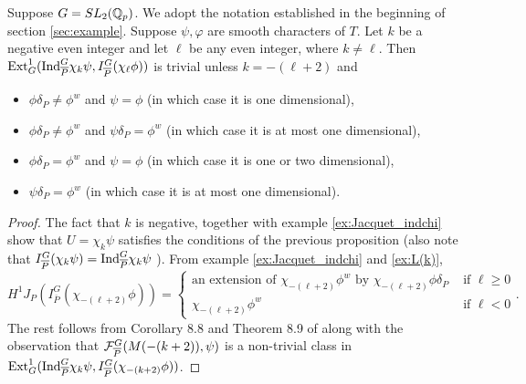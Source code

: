 \documentclass[10pt]{amsart}
\begin{document}
\begin{corollary}
Suppose $G=SL_{2}(\mathbb{Q}_{p})$. We adopt the notation established in the beginning of section \ref{sec:example}.  Suppose $\psi, \varphi$ are smooth characters of $T$. Let $k$ be a negative even integer and let $\ell$ be any even integer, where $k\neq \ell$. Then $\textnormal{Ext}^{1}_{G}(\textnormal{Ind}_{\overline{P}}^{G}\chi_{k}\psi,I_{\overline{P}}^{G}(\chi_{\ell}\phi))$ is trivial unless $k=-(\ell+2)$ and \begin{itemize}
    \item $\phi\delta_P \neq \phi^{w}$ and $\psi = \phi$ (in which case it is one dimensional),
    \item $\phi\delta_P \neq \phi^{w}$ and $\psi\delta_P=\phi^{w}$ (in which case it is at most one dimensional),
    \item $\phi\delta_P = \phi^{w}$ and $\psi = \phi$ (in which case it is one or two dimensional),
    \item $\psi\delta_P=\phi^{w}$ (in which case it is at most one dimensional).
\end{itemize} 
\end{corollary} 
\begin{proof}
The fact that $k$ is negative, together with example \ref{ex:Jacquet_indchi} show that $U=\chi_{k}\psi$ satisfies the conditions of the previous proposition (also note that $I_{\overline{P}}^{G}(\chi_{k}\psi) = \textnormal{Ind}_{\overline{P}}^{G}\chi_{k}\psi$ \cite[Ex. 5.1.9]{Jacquet2}). From example \ref{ex:Jacquet_indchi} and \ref{ex:L(k)}, \[
    H^1J_P(I_{\overline{P}}^{G}(\chi_{-(\ell+2)}\phi)) = \begin{cases} 
    \text{an extension of }\chi_{-(\ell+2)}\phi^{w}\text{ by }\chi_{-(\ell+2)}\phi\delta_P & \text{ if $\ell \geq 0$}\\
    \chi_{-(\ell+2)}\phi^{w} & \text{ if $\ell<0$} 
    \end{cases}.
\] The rest follows from Corollary 8.8 and Theorem 8.9 of \cite{Kohlhaase} along with the observation that $\mathcal{F}_{\overline{P}}^{G}(M(-(k+2)),\psi)$ is a non-trivial class in $\textnormal{Ext}^{1}_{G}(\textnormal{Ind}_{\overline{P}}^{G}\chi_{k}\psi,I_{\overline{P}}^{G}(\chi_{-(k+2)}\phi))$. \end{proof}
\end{document}

